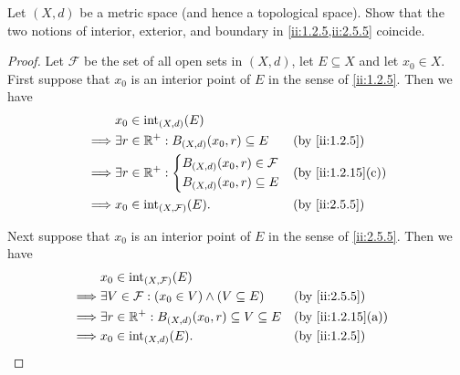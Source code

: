 \begin{ex}\label{ii:ex:2.5.3}
  Let \((X, d)\) be a metric space (and hence a topological space).
  Show that the two notions of interior, exterior, and boundary in \cref{ii:1.2.5,ii:2.5.5} coincide.
\end{ex}

\begin{proof}
  Let \(\mathcal{F}\) be the set of all open sets in \((X, d)\), let \(E \subseteq X\) and let \(x_0 \in X\).
  First suppose that \(x_0\) is an interior point of \(E\) in the sense of \cref{ii:1.2.5}.
  Then we have
  \begin{align*}
             & x_0 \in \text{int}_{(X, d)}(E)                                      \\
    \implies & \exists r \in \R^+ : B_{(X, d)}(x_0, r) \subseteq E &  & \by{ii:1.2.5} \\
    \implies & \exists r \in \R^+ : \begin{dcases}
                                      B_{(X, d)}(x_0, r) \in \mathcal{F} \\
                                      B_{(X, d)}(x_0, r) \subseteq E
                                    \end{dcases}               &  & \by{ii:1.2.15}[c] \\
    \implies & x_0 \in \text{int}_{(X, \mathcal{F})}(E).           &  & \by{ii:2.5.5}
  \end{align*}

  Next suppose that \(x_0\) is an interior point of \(E\) in the sense of \cref{ii:2.5.5}.
  Then we have
  \begin{align*}
             & x_0 \in \text{int}_{(X, \mathcal{F})}(E)                                            \\
    \implies & \exists V \in \mathcal{F} : (x_0 \in V) \land (V \subseteq E)   &  & \by{ii:2.5.5}     \\
    \implies & \exists r \in \R^+ : B_{(X, d)}(x_0, r) \subseteq V \subseteq E &  & \by{ii:1.2.15}[a] \\
    \implies & x_0 \in \text{int}_{(X, d)}(E).                                 &  & \by{ii:1.2.5}
  \end{align*}


\end{proof}
